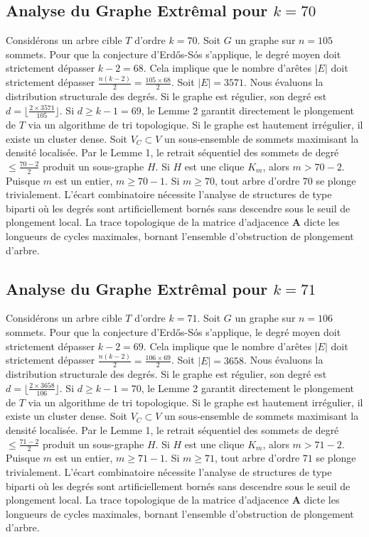 \documentclass[11pt,a4paper]{article}
\begin{document}
\subsection{Analyse du Graphe Extr\^emal pour $k=70$}
Consid\'erons un arbre cible $T$ d'ordre $k=70$.
Soit $G$ un graphe sur $n=105$ sommets.
Pour que la conjecture d'Erd\H{o}s-S\'os s'applique, le degr\'e moyen doit strictement d\'epasser $k-2 = 68$.
Cela implique que le nombre d'ar\^etes $|E|$ doit strictement d\'epasser $\frac{n(k-2)}{2} = \frac{105 \times 68}{2}$.
Soit $|E| = 3571$.
Nous \'evaluons la distribution structurale des degr\'es. Si le graphe est r\'egulier, son degr\'e est $d = \lfloor \frac{2 \times 3571}{105} \rfloor$.
Si $d \geq k-1 = 69$, le Lemme 2 garantit directement le plongement de $T$ via un algorithme de tri topologique.
Si le graphe est hautement irr\'egulier, il existe un cluster dense. Soit $V_C \subset V$ un sous-ensemble de sommets maximisant la densit\'e localis\'ee.
Par le Lemme 1, le retrait s\'equentiel des sommets de degr\'e $\leq \frac{70-2}{2}$ produit un sous-graphe $H$.
Si $H$ est une clique $K_{m}$, alors $m > 70-2$. Puisque $m$ est un entier, $m \geq 70-1$. Si $m \geq 70$, tout arbre d'ordre $70$ se plonge trivialement.
L'\'ecart combinatoire n\'ecessite l'analyse de structures de type biparti o\`u les degr\'es sont artificiellement born\'es sans descendre sous le seuil de plongement local. La trace topologique de la matrice d'adjacence $\mathbf{A}$ dicte les longueurs de cycles maximales, bornant l'ensemble d'obstruction de plongement d'arbre.


\subsection{Analyse du Graphe Extr\^emal pour $k=71$}
Consid\'erons un arbre cible $T$ d'ordre $k=71$.
Soit $G$ un graphe sur $n=106$ sommets.
Pour que la conjecture d'Erd\H{o}s-S\'os s'applique, le degr\'e moyen doit strictement d\'epasser $k-2 = 69$.
Cela implique que le nombre d'ar\^etes $|E|$ doit strictement d\'epasser $\frac{n(k-2)}{2} = \frac{106 \times 69}{2}$.
Soit $|E| = 3658$.
Nous \'evaluons la distribution structurale des degr\'es. Si le graphe est r\'egulier, son degr\'e est $d = \lfloor \frac{2 \times 3658}{106} \rfloor$.
Si $d \geq k-1 = 70$, le Lemme 2 garantit directement le plongement de $T$ via un algorithme de tri topologique.
Si le graphe est hautement irr\'egulier, il existe un cluster dense. Soit $V_C \subset V$ un sous-ensemble de sommets maximisant la densit\'e localis\'ee.
Par le Lemme 1, le retrait s\'equentiel des sommets de degr\'e $\leq \frac{71-2}{2}$ produit un sous-graphe $H$.
Si $H$ est une clique $K_{m}$, alors $m > 71-2$. Puisque $m$ est un entier, $m \geq 71-1$. Si $m \geq 71$, tout arbre d'ordre $71$ se plonge trivialement.
L'\'ecart combinatoire n\'ecessite l'analyse de structures de type biparti o\`u les degr\'es sont artificiellement born\'es sans descendre sous le seuil de plongement local. La trace topologique de la matrice d'adjacence $\mathbf{A}$ dicte les longueurs de cycles maximales, bornant l'ensemble d'obstruction de plongement d'arbre.
\end{document}

